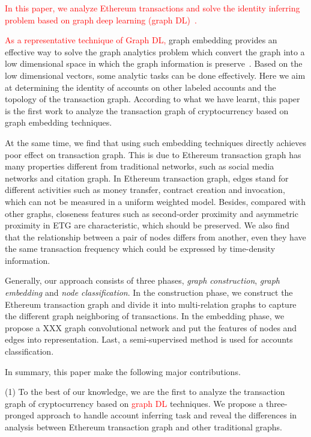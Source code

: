 
\textcolor{red}{In this paper, we analyze Ethereum transactions and solve the identity inferring problem based on graph deep learning (graph DL)~\cite{battaglia2018relational}.}

\textcolor{red}{As a representative technique of Graph DL, }graph embedding provides an effective way to solve the graph analytics problem which convert the graph into a low dimensional space in which the graph information is preserve~\cite{cai2018comprehensive}. Based on the low dimensional vectors, some analytic tasks can be done effectively. Here we aim at determining the identity of accounts on other labeled accounts and the topology of the transaction graph. According to what we have learnt, this paper is the first work to analyze the transaction graph of cryptocurrency based on graph embedding techniques.

At the same time, we find that using such embedding techniques directly achieves poor effect on transaction graph. This is due to Ethereum transaction graph has many properties different from traditional networks, such as social media networks and citation graph. In Ethereum transaction graph, edges stand for different activities such as money transfer, contract creation and invocation, which can not be measured in a uniform weighted model. Besides, compared with other graphs, closeness features such as second-order proximity and asymmetric proximity in ETG are characteristic, which should be preserved. We also find that the relationship between a pair of nodes differs from another, even they have the same transaction frequency which could be expressed by time-density information.

Generally, our approach consists of three phases, \emph{graph construction}, \emph{graph embedding} and \emph{node classification}. In the construction phase, we construct the Ethereum transaction graph and divide it into multi-relation graphs to capture the different graph neighboring of transactions. In the embedding phase, we propose a XXX graph convolutional network and put the features of nodes and edges into representation. Last, a semi-supervised method is used for accounts classification.

In summary, this paper make the following major contributions.

(1) To the best of our knowledge, we are the first to analyze the transaction graph of cryptocurrency based on \textcolor{red}{graph DL} techniques. We propose a three-pronged approach to handle account inferring task and reveal the differences in analysis between Ethereum transaction graph and other traditional graphs.

